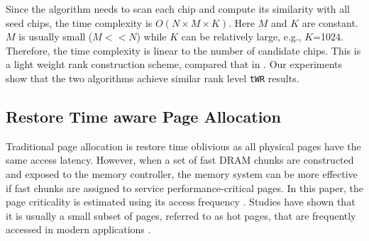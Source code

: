Since the algorithm needs to scan each chip and compute its similarity with all seed chips, the time complexity is $O(N\times M \times K)$. Here $M$ and $K$ are constant. $M$ is usually small ($M << N$) while $K$ can be relatively large, e.g., $K$=1024. Therefore, the time complexity is linear to the number of candidate chips. This is a light weight rank construction scheme, compared that in \cite{DAC15:radar}. Our experiments show that the two algorithms achieve similar rank level {\tt tWR} results. 

\subsection{Restore Time aware Page Allocation}
\label{subsec:page_alloc}
Traditional page allocation is restore time oblivious as all physical pages have the same access latency. However, when a set of fast DRAM chunks are constructed and exposed to the memory controller, %
the memory system can be more effective if fast chunks are assigned to service performance-critical pages. In this paper, the page criticality is estimated using its access frequency \cite{ISCA13:charm,TC01:alloc}. Studies have shown that it is usually a small subset of pages, referred to as hot pages, that are frequently accessed in modern applications \cite{ISCA09:hot_page,ICS11:hot_page,TODAES13:hot_page}. %




